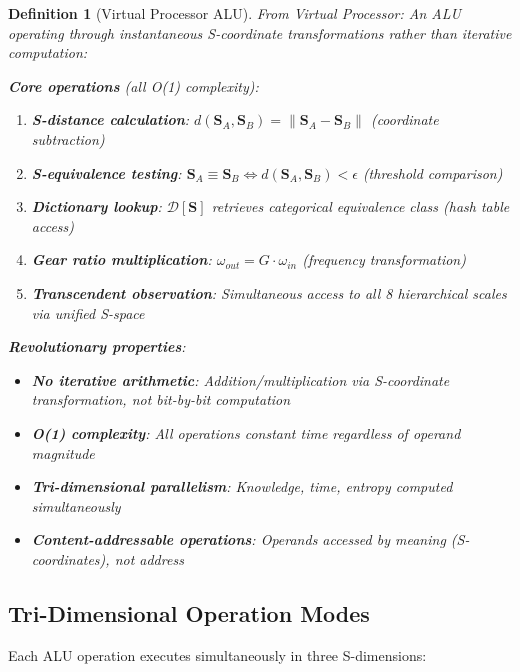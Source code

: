 \documentclass[11pt,a4paper]{article}
\newtheorem{definition}{Definition}[section]
\begin{document}
\begin{definition}[Virtual Processor ALU]
From Virtual Processor\cite{virtual_processor}: An ALU operating through instantaneous S-coordinate transformations rather than iterative computation:

\textbf{Core operations} (all O(1) complexity):
\begin{enumerate}
\item \textbf{S-distance calculation}: $d(\mathbf{S}_A, \mathbf{S}_B) = \|\mathbf{S}_A - \mathbf{S}_B\|$ (coordinate subtraction)
\item \textbf{S-equivalence testing}: $\mathbf{S}_A \equiv \mathbf{S}_B \Leftrightarrow d(\mathbf{S}_A, \mathbf{S}_B) < \epsilon$ (threshold comparison)
\item \textbf{Dictionary lookup}: $\mathcal{D}[\mathbf{S}]$ retrieves categorical equivalence class (hash table access)
\item \textbf{Gear ratio multiplication}: $\omega_{out} = G \cdot \omega_{in}$ (frequency transformation)
\item \textbf{Transcendent observation}: Simultaneous access to all 8 hierarchical scales via unified S-space
\end{enumerate}

\textbf{Revolutionary properties}:
\begin{itemize}
\item \textbf{No iterative arithmetic}: Addition/multiplication via S-coordinate transformation, not bit-by-bit computation
\item \textbf{O(1) complexity}: All operations constant time regardless of operand magnitude
\item \textbf{Tri-dimensional parallelism}: Knowledge, time, entropy computed simultaneously
\item \textbf{Content-addressable operations}: Operands accessed by meaning (S-coordinates), not address
\end{itemize}
\end{definition}

\subsection{Tri-Dimensional Operation Modes}

Each ALU operation executes simultaneously in three S-dimensions:
\end{document}

